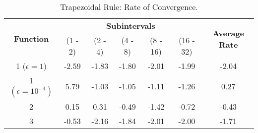 \begin{table}[H]
    \centering
    \caption{Trapezoidal Rule: Rate of Convergence.}
    \label{tab:trapezoidal_rate}
    \begin{tabular}{ccccccc}
        \hline
        \multirow{2}{*}{\textbf{Function}} & \multicolumn{5}{c}{\textbf{Subintervals}} & \multicolumn{1}{c}{\multirow{2}{*}{\textbf{Average Rate}}} \\ \cline{2-6}
 & (1 - 2) & (2 - 4) & (4 - 8) & (8 - 16) & (16 - 32) & \multicolumn{1}{c}{} \\ \hline
        \makecell{1 \\ ($\epsilon = 1$)} & -2.59 & -1.83 & -1.80 & -2.01 & -1.99 & -2.04 \\
        \makecell{1 \\ $\left(\epsilon = 10^{-4}\right)$} & 5.79 & -1.03 & -1.05 & -1.11 & -1.26 & 0.27 \\
        2 & 0.15 & 0.31 & -0.49 & -1.42 & -0.72 & -0.43 \\ 
        3 & -0.53 & -2.16 & -1.84 & -2.01 & -2.00 & -1.71 \\ \hline
    \end{tabular}
\end{table}

